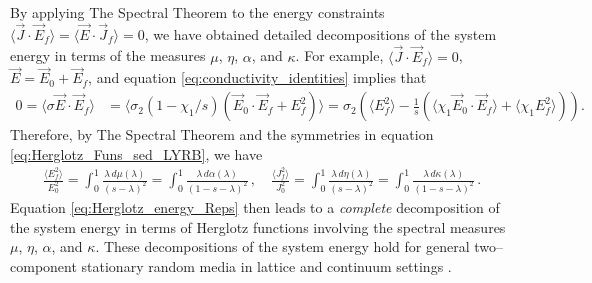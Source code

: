 \documentclass[jmp,graphicx]{revtex4-1}
\begin{document}
By applying The Spectral Theorem to the energy constraints
$\langle\vec{J}\cdot\vec{E}_f\rangle=\langle\vec{E}\cdot\vec{J}_f\rangle=0$, we have obtained detailed
decompositions of the system energy in terms of the measures $\mu$, $\eta$,
$\alpha$, and $\kappa$. For example, $\langle\vec{J}\cdot\vec{E}_f\rangle=0$,
$\vec{E}=\vec{E}_0+\vec{E}_f$, and equation
\eqref{eq:conductivity_identities} implies that  
%
\begin{align*}
  0=\langle\sigma\vec{E}\cdot\vec{E}_f\rangle&=\langle\sigma_2(1-\chi_1/s)(\vec{E}_0\cdot\vec{E}_f+E_f^2)\rangle
 =\sigma_2\left(\langle E_f^2\rangle- \frac{1}{s}\left(\langle\chi_1\vec{E}_0\cdot\vec{E}_f\rangle
     + \langle\chi_1E_f^2\rangle\right)\right).
\end{align*}
%
Therefore, by The Spectral Theorem \cite{Reed-1980} and the symmetries
in equation \eqref{eq:Herglotz_Funs_sed_LYRB}, we have
%
\begin{align}\label{eq:Herglotz_energy_Reps}
 \frac{\langle E_f^2\rangle}{E_0^2}=\int_0^1 \frac{\lambda\,d\mu(\lambda)}{(s-\lambda)^2}
           =\int_0^1 \frac{\lambda\,d\alpha(\lambda)}{(1-s-\lambda)^2}\,,\quad
 \frac{\langle J_f^2\rangle}{J_0^2}=\int_0^1 \frac{\lambda\,d\eta(\lambda)}{(s-\lambda)^2}
           =\int_0^1 \frac{\lambda\,d\kappa(\lambda)}{(1-s-\lambda)^2}\,.
\end{align}
%
Equation \eqref{eq:Herglotz_energy_Reps} then leads to a
\emph{complete} decomposition of the system energy in terms of
Herglotz functions involving the spectral measures $\mu$, $\eta$, $\alpha$, and
$\kappa$.
These decompositions of the system energy hold for general
two--component stationary random media in lattice and continuum
settings \cite{Golden:PRL-3935}.  
\end{document}
